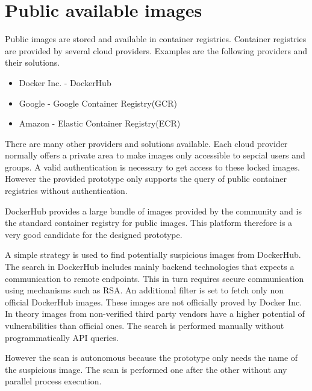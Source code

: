 \section{Public available images}
\label{ch:eval:public_images}
Public images are stored and available in container registries. 
Container registries are provided by several cloud providers.
Examples are the following providers and their solutions.
\begin{itemize}
    \item Docker Inc. - DockerHub
    \item Google - Google Container Registry(GCR)
    \item Amazon - Elastic Container Registry(ECR)
\end{itemize}{}    
There are many other providers and solutions available. 
Each cloud provider normally offers a private area to make images only accessible to sepcial users and groups. 
A valid authentication is necessary to get access to these locked images.
However the provided prototype only supports the query of public container registries without authentication.

DockerHub provides a large bundle of images provided by the community and is the standard container registry for public images.
This platform therefore is a very good candidate for the designed prototype.

A simple strategy is used to find potentially suspicious images from DockerHub.
The search in DockerHub includes mainly backend technologies that expects a communication to remote endpoints.
This in turn requires secure communication using mechanisms such as RSA.
An additional filter is set to fetch only non official DockerHub images.
These images are not officially proved by Docker Inc.
In theory images from non-verified third party vendors have a higher potential of vulnerabilities than official ones.
The search is performed manually without programmatically API queries. 

However the scan is autonomous because the prototype only needs the name of the suspicious image.
The scan is performed one after the other without any parallel process execution.

